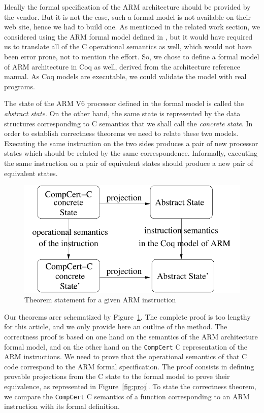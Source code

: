 \documentclass[twocolumn]{article}
\newcommand{\compcert}{\texttt{CompCert}\xspace}
\begin{document}
Ideally the formal specification of the ARM architecture should be
provided by the vendor. But it is not the case, such a formal model is
not available on their web site, hence we had to build one.  As
mentioned in the related work section, we considered using the ARM
formal model defined in \cite{FoxM10}, but it would have required us
to translate all of the C operational semantics as well, which would
not have been error prone, not to mention the effort. So, we chose to
define a formal model of ARM architecture in Coq as well, derived from
the architecture reference manual. As Coq models are executable, we
could validate the model with real programs.

The state of the ARM V6 processor defined in the formal model is called
the \emph{abstract state}.  On the other hand, the same state is
represented by the data structures corresponding to C semantics that
we shall call the \emph{concrete state}.  In order to establish
correctness theorems we need to relate these two models.  Executing
the same instruction on the two sides produces a pair of new processor
states which should be related by the same correspondence. Informally,
executing the same instruction on a pair of equivalent states should
produce a new pair of equivalent states.

\begin{figure}
\hfil\includegraphics[width=.75\linewidth]{fig/theoremca.pdf}
\caption{Theorem statement for a given ARM instruction}
\label{fig:theoca}
\end{figure}

Our theorems arer schematized by Figure~\ref{fig:theoca}. The complete
proof is too lengthy for this article, and we only provide here an
outline of the method.  The correctness proof is based on one hand on
the semantics of the ARM architecture formal model, and on the other
hand on the \compcert C representation of the ARM instructions. We
need to prove that the operational semantics of that C code correspond
to the ARM formal specification.  The proof consists in defining
provable projections from the C state to the formal model to prove
their equivalence, as represented in Figure~\ref{fig:proj}.  To state
the correctness theorem, we compare the \compcert C semantics of a
function corresponding to an ARM instruction with its formal
definition.
\end{document}
